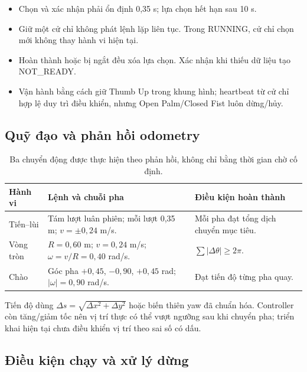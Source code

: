 \documentclass[12pt,a4paper]{article}
\newcommand{\smalltable}{\small\setlength{\tabcolsep}{4pt}\renewcommand{\arraystretch}{1.12}}
\begin{document}
\begin{itemize}
\item Chọn và xác nhận phải ổn định 0,35 s; lựa chọn hết hạn sau 10 s.
\item Giữ một cử chỉ không phát lệnh lặp liên tục. Trong RUNNING, cử chỉ chọn mới không thay hành vi hiện tại.
\item Hoàn thành hoặc bị ngắt đều xóa lựa chọn. Xác nhận khi thiếu dữ liệu tạo NOT\_READY.
\item Vận hành bằng cách giữ Thumb Up trong khung hình; heartbeat từ cử chỉ hợp lệ duy trì điều khiển, nhưng Open Palm/Closed Fist luôn dừng/hủy.
\end{itemize}

\subsection{Quỹ đạo và phản hồi odometry}

\begin{table}[!htbp]\centering\smalltable
\begin{tabularx}{\linewidth}{@{}p{2.5cm}Lp{4.5cm}@{}}\toprule
\textbf{Hành vi} & \textbf{Lệnh và chuỗi pha} & \textbf{Điều kiện hoàn thành}\\\midrule
Tiến--lùi & Tám lượt luân phiên; mỗi lượt 0,35 m; $v=\pm0{,}24$ m/s. & Mỗi pha đạt tổng dịch chuyển mục tiêu.\\
Vòng tròn & $R=0{,}60$ m; $v=0{,}24$ m/s; $\omega=v/R=0{,}40$ rad/s. & $\sum|\Delta\theta|\geq2\pi$.\\
Chào & Góc pha $+0{,}45$, $-0{,}90$, $+0{,}45$ rad; $|\omega|=0{,}90$ rad/s. & Đạt tiến độ từng pha quay.\\\bottomrule
\end{tabularx}
\caption{Ba chuyển động được thực hiện theo phản hồi, không chỉ bằng thời gian chờ cố định.}
\end{table}

Tiến độ dùng $\Delta s=\sqrt{\Delta x^2+\Delta y^2}$ hoặc biến thiên yaw đã chuẩn hóa. Controller còn tăng/giảm tốc nên vị trí thực có thể vượt ngưỡng sau khi chuyển pha; triển khai hiện tại chưa điều khiển vị trí theo sai số có dấu.

\subsection{Điều kiện chạy và xử lý dừng}
\end{document}
